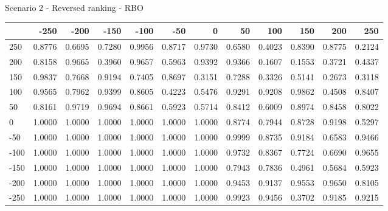 Scenario 2 - Reversed ranking - RBO
\begin{tabular}{lrrrrrrrrrrr}
\toprule
{} &   -250 &   -200 &   -150 &   -100 &   -50  &    0   &    50  &    100 &    150 &    200 &    250 \\
\midrule
 250 & 0.8776 & 0.6695 & 0.7280 & 0.9956 & 0.8717 & 0.9730 & 0.6580 & 0.4023 & 0.8390 & 0.8775 & 0.2124 \\
 200 & 0.8158 & 0.9665 & 0.3960 & 0.9657 & 0.5963 & 0.9392 & 0.9366 & 0.1607 & 0.1553 & 0.3721 & 0.4337 \\
 150 & 0.9837 & 0.7668 & 0.9194 & 0.7405 & 0.8697 & 0.3151 & 0.7288 & 0.3326 & 0.5141 & 0.2673 & 0.3118 \\
 100 & 0.9565 & 0.7962 & 0.9399 & 0.8605 & 0.4223 & 0.5476 & 0.9291 & 0.9208 & 0.9862 & 0.4508 & 0.8407 \\
 50  & 0.8161 & 0.9719 & 0.9694 & 0.8661 & 0.5923 & 0.5714 & 0.8412 & 0.6009 & 0.8974 & 0.8458 & 0.8022 \\
 0   & 1.0000 & 1.0000 & 1.0000 & 1.0000 & 1.0000 & 1.0000 & 0.8774 & 0.7944 & 0.8728 & 0.9198 & 0.5297 \\
-50  & 1.0000 & 1.0000 & 1.0000 & 1.0000 & 1.0000 & 1.0000 & 0.9999 & 0.8735 & 0.9184 & 0.6583 & 0.9466 \\
-100 & 1.0000 & 1.0000 & 1.0000 & 1.0000 & 1.0000 & 1.0000 & 0.9732 & 0.8367 & 0.7724 & 0.6690 & 0.9655 \\
-150 & 1.0000 & 1.0000 & 1.0000 & 1.0000 & 1.0000 & 1.0000 & 0.7943 & 0.7836 & 0.4961 & 0.5684 & 0.5923 \\
-200 & 1.0000 & 1.0000 & 1.0000 & 1.0000 & 1.0000 & 1.0000 & 0.9453 & 0.9137 & 0.9553 & 0.9650 & 0.8105 \\
-250 & 1.0000 & 1.0000 & 1.0000 & 1.0000 & 1.0000 & 1.0000 & 0.9923 & 0.9456 & 0.3702 & 0.9185 & 0.9215 \\
\bottomrule
\end{tabular}

